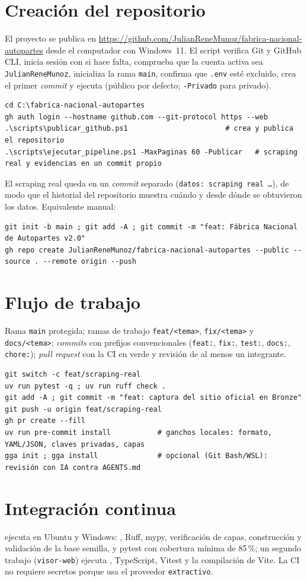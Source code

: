 \section{Creación del repositorio}
El proyecto se publica en \url{https://github.com/JulianReneMunoz/fabrica-nacional-autopartes} desde el
computador con Windows~11. El script  verifica Git y GitHub CLI, inicia
sesión con  si hace falta, comprueba que la cuenta activa sea \texttt{JulianReneMunoz},
inicializa la rama \texttt{main}, confirma que \texttt{.env} esté excluido, crea el primer \emph{commit} y
ejecuta  (público por defecto; \texttt{-Privado} para privado).
\begin{lstlisting}[style=ps]
cd C:\fabrica-nacional-autopartes
gh auth login --hostname github.com --git-protocol https --web
.\scripts\publicar_github.ps1                       # crea y publica el repositorio
.\scripts\ejecutar_pipeline.ps1 -MaxPaginas 60 -Publicar   # scraping real y evidencias en un commit propio
\end{lstlisting}
El scraping real queda en un \emph{commit} separado (\texttt{datos: scraping real \dots}), de modo que el
historial del repositorio muestra cuándo y desde dónde se obtuvieron los datos. Equivalente manual:
\begin{lstlisting}[style=ps]
git init -b main ; git add -A ; git commit -m "feat: Fábrica Nacional de Autopartes v2.0"
gh repo create JulianReneMunoz/fabrica-nacional-autopartes --public --source . --remote origin --push
\end{lstlisting}

\section{Flujo de trabajo}
Rama \texttt{main} protegida; ramas de trabajo \texttt{feat/<tema>}, \texttt{fix/<tema>} y \texttt{docs/<tema>};
\emph{commits} con prefijos convencionales (\texttt{feat:}, \texttt{fix:}, \texttt{test:}, \texttt{docs:},
\texttt{chore:}); \emph{pull request} con la CI en verde y revisión de al menos un integrante.
\begin{lstlisting}[style=ps]
git switch -c feat/scraping-real
uv run pytest -q ; uv run ruff check .
git add -A ; git commit -m "feat: captura del sitio oficial en Bronze"
git push -u origin feat/scraping-real
gh pr create --fill
uv run pre-commit install           # ganchos locales: formato, YAML/JSON, claves privadas, capas
gga init ; gga install              # opcional (Git Bash/WSL): revisión con IA contra AGENTS.md
\end{lstlisting}
\section{Integración continua}
 ejecuta en Ubuntu y Windows: , Ruff, mypy, verificación de
capas, construcción y validación de la base semilla, y pytest con cobertura mínima de 85\,\%; un segundo trabajo
(\texttt{visor-web}) ejecuta , TypeScript, Vitest y la compilación de Vite. La CI no requiere secretos
porque usa el proveedor \texttt{extractivo}.
